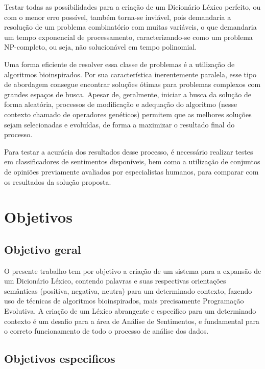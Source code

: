 \documentclass[a4paper,11pt]{article}
\begin{document}
Testar todas as possibilidades para a criação de um Dicionário Léxico perfeito, ou com o menor erro possível, também torna-se inviável, pois demandaria a resolução de um problema combinatório com muitas variáveis, o que demandaria um tempo exponencial de processamento, caracterizando-se como um problema NP-completo, ou seja, não solucionável em tempo polinomial.

Uma forma eficiente de resolver essa classe de problemas é a utilização de algoritmos bioinspirados. Por sua característica inerentemente paralela, esse tipo de abordagem consegue encontrar soluções ótimas para problemas complexos com grandes espaços de busca. Apesar de, geralmente, iniciar a busca da solução de forma aleatória, processos de modificação e adequação do algoritmo (nesse contexto chamado de operadores genéticos) permitem que as melhores soluções sejam selecionadas e evoluídas, de forma a maximizar o resultado final do processo.

Para testar a acurácia dos resultados desse processo, é necessário realizar testes em classificadores de sentimentos disponíveis, bem como a utilização de conjuntos de opiniões previamente avaliados por especialistas humanos, para comparar com os resultados da solução proposta.

\section{Objetivos}
\label{sec:obj}
\subsection{Objetivo geral}
O presente trabalho tem por objetivo a criação de um sistema para a expansão de um Dicionário Léxico, contendo palavras e suas respectivas orientações semânticas (positiva, negativa, neutra) para um determinado contexto, fazendo uso de técnicas de algoritmos bioinspirados, mais precisamente Programação Evolutiva. A criação de um Léxico abrangente e específico para um determinado contexto é um desafio para a área de Análise de Sentimentos, e fundamental para o correto funcionamento de todo o processo de análise dos dados.

\subsection{Objetivos especificos}
\end{document}
